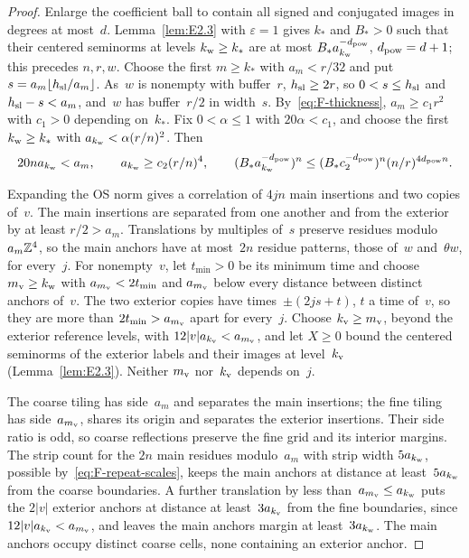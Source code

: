 \begin{proof}
Enlarge the coefficient ball to contain all signed and conjugated images in degrees at most~$d$. Lemma~\ref{lem:E2.3} with $\varepsilon=1$ gives $k_*$ and $B_*>0$ such that their centered seminorms at levels $k_{\rm w}\ge k_*$ are at most $B_* a_{k_{\rm w}}^{-d_{\rm pow}}$, $d_{\rm pow}=d+1$; this precedes $n,r,w$. Choose the first $m\ge k_*$ with $a_m<r/32$ and put $s=a_m\lfloor h_{\rm sl}/a_m\rfloor$. As~$w$ is nonempty with buffer~$r$, $h_{\rm sl}\ge2r$, so $0<s\le h_{\rm sl}$ and $h_{\rm sl}-s<a_m$, and~$w$ has buffer~$r/2$ in width~$s$. By~\eqref{eq:F-thickness}, $a_m\ge c_1r^2$ with $c_1>0$ depending on~$k_*$. Fix $0<\alpha\le1$ with $20\alpha<c_1$, and choose the first $k_{\rm w}\ge k_*$ with $a_{k_{\rm w}}<\alpha(r/n)^2$. Then
\begin{equation}\label{eq:F-repeat-scales}
20na_{k_{\rm w}}<a_m,\qquad a_{k_{\rm w}}\ge c_2(r/n)^4,\qquad
(B_*a_{k_{\rm w}}^{-d_{\rm pow}})^n\le (B_*c_2^{-d_{\rm pow}})^n(n/r)^{4d_{\rm pow}n}.
\end{equation}

Expanding the OS norm gives a correlation of $4jn$ main insertions and two copies of~$v$. The main insertions are separated from one another and from the exterior by at least $r/2>a_m$. Translations by multiples of~$s$ preserve residues modulo~$a_m\mathbb{Z}^4$, so the main anchors have at most~$2n$ residue patterns, those of~$w$ and~$\theta w$, for every~$j$. For nonempty~$v$, let $t_{\min}>0$ be its minimum time and choose $m_{\rm v}\ge k_{\rm w}$ with $a_{m_{\rm v}}<2t_{\min}$ and $a_{m_{\rm v}}$ below every distance between distinct anchors of~$v$. The two exterior copies have times~$\pm(2js+t)$, $t$ a time of~$v$, so they are more than $2t_{\min}>a_{m_{\rm v}}$ apart for every~$j$. Choose $k_{\rm v}\ge m_{\rm v}$, beyond the exterior reference levels, with $12|v|a_{k_{\rm v}}<a_{m_{\rm v}}$, and let $X\ge0$ bound the centered seminorms of the exterior labels and their images at level~$k_{\rm v}$ (Lemma~\ref{lem:E2.3}). Neither $m_{\rm v}$ nor~$k_{\rm v}$ depends on~$j$.

The coarse tiling has side~$a_m$ and separates the main insertions; the fine tiling has side~$a_{m_{\rm v}}$, shares its origin and separates the exterior insertions. Their side ratio is odd, so coarse reflections preserve the fine grid and its interior margins. The strip count for the $2n$ main residues modulo~$a_m$ with strip width $5a_{k_{\rm w}}$, possible by~\eqref{eq:F-repeat-scales}, keeps the main anchors at distance at least~$5a_{k_{\rm w}}$ from the coarse boundaries. A further translation by less than~$a_{m_{\rm v}}\le a_{k_{\rm w}}$ puts the $2|v|$ exterior anchors at distance at least~$3a_{k_{\rm v}}$ from the fine boundaries, since $12|v|a_{k_{\rm v}}<a_{m_{\rm v}}$, and leaves the main anchors margin at least~$3a_{k_{\rm w}}$. The main anchors occupy distinct coarse cells, none containing an exterior anchor.


\end{proof}
